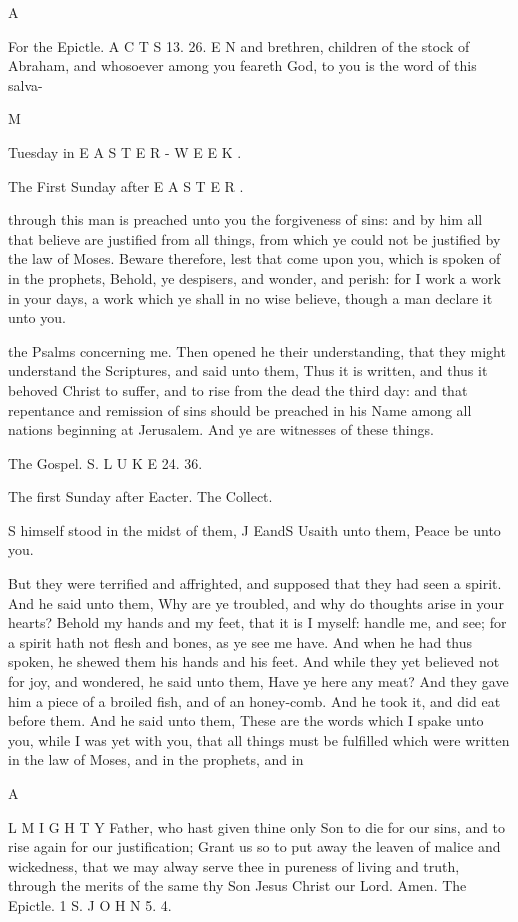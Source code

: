 A

For the Epictle. A C T S 13. 26. E N and brethren, children of the stock of Abraham, and whosoever among you feareth God, to you is the word of this salva-

M

Tuesday in E A S T E R - W E E K .

The First Sunday after E A S T E R .

through this man is preached unto you the forgiveness of sins: and by him all that believe are justified from all things, from which ye could not be justified by the law of Moses. Beware therefore, lest that come upon you, which is spoken of in the prophets, Behold, ye despisers, and wonder, and perish: for I work a work in your days, a work which ye shall in no wise believe, though a man declare it unto you.

the Psalms concerning me. Then opened he their understanding, that they might understand the Scriptures, and said unto them, Thus it is written, and thus it behoved Christ to suffer, and to rise from the dead the third day: and that repentance and remission of sins should be preached in his Name among all nations beginning at Jerusalem. And ye are witnesses of these things.

The Gospel. S. L U K E 24. 36.

The first Sunday after Eacter. The Collect.

S himself stood in the midst of them, J EandS Usaith unto them, Peace be unto you.

But they were terrified and affrighted, and supposed that they had seen a spirit. And he said unto them, Why are ye troubled, and why do thoughts arise in your hearts? Behold my hands and my feet, that it is I myself: handle me, and see; for a spirit hath not flesh and bones, as ye see me have. And when he had thus spoken, he shewed them his hands and his feet. And while they yet believed not for joy, and wondered, he said unto them, Have ye here any meat? And they gave him a piece of a broiled fish, and of an honey-comb. And he took it, and did eat before them. And he said unto them, These are the words which I spake unto you, while I was yet with you, that all things must be fulfilled which were written in the law of Moses, and in the prophets, and in

A

L M I G H T Y Father, who hast given thine only Son to die for our sins, and to rise again for our justification; Grant us so to put away the leaven of malice and wickedness, that we may alway serve thee in pureness of living and truth, through the merits of the same thy Son Jesus Christ our Lord. Amen. The Epictle. 1 S. J O H N 5. 4.

